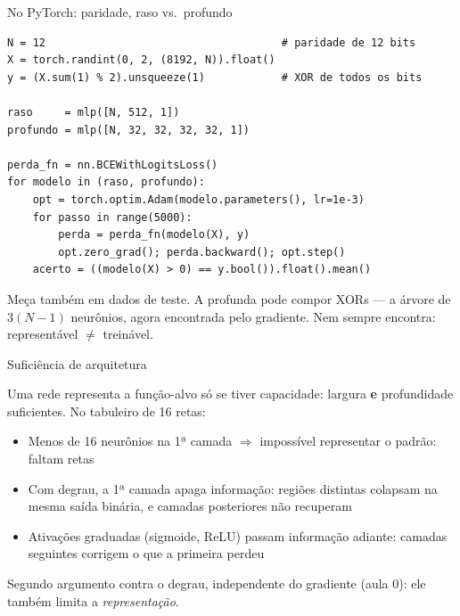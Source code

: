 \documentclass[aspectratio=169, 11pt]{beamer}
\begin{document}
\begin{frame}[fragile]{No PyTorch: paridade, raso vs.\ profundo}

\begin{lstlisting}
N = 12                                     # paridade de 12 bits
X = torch.randint(0, 2, (8192, N)).float()
y = (X.sum(1) % 2).unsqueeze(1)            # XOR de todos os bits

raso     = mlp([N, 512, 1])
profundo = mlp([N, 32, 32, 32, 32, 1])

perda_fn = nn.BCEWithLogitsLoss()
for modelo in (raso, profundo):
    opt = torch.optim.Adam(modelo.parameters(), lr=1e-3)
    for passo in range(5000):
        perda = perda_fn(modelo(X), y)
        opt.zero_grad(); perda.backward(); opt.step()
    acerto = ((modelo(X) > 0) == y.bool()).float().mean()
\end{lstlisting}

  \smallskip
  {\small Meça também em dados de teste. A profunda pode compor XORs — a
  árvore de $3(N-1)$ neurônios, agora encontrada pelo gradiente. Nem sempre
  encontra: representável $\ne$ treinável.}
\end{frame}

\begin{frame}{Suficiência de arquitetura}

  Uma rede representa a função-alvo só se tiver capacidade: largura
  \textbf{e} profundidade suficientes. No tabuleiro de 16 retas:

  \begin{itemize}\setlength{\itemsep}{0.25ex}
    \item Menos de 16 neurônios na 1ª camada $\Rightarrow$ impossível
          representar o padrão: faltam retas
    \item Com degrau, a 1ª camada \alert{apaga informação}: regiões
          distintas colapsam na mesma saída binária, e camadas posteriores
          não recuperam
    \item Ativações graduadas (sigmoide, ReLU) passam informação adiante:
          camadas seguintes corrigem o que a primeira perdeu
  \end{itemize}

  \smallskip
  \begin{ideiabox}
    Segundo argumento contra o degrau, independente do gradiente (aula 0):
    ele também limita a \emph{representação}.
  \end{ideiabox}
\end{frame}
\end{document}
